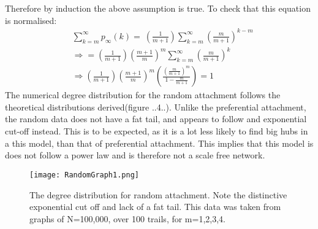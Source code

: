 \documentclass[]{article}
\begin{document}
Therefore by induction the above assumption is true. To check that this equation is normalised:
\begin{equation}
\begin{align}
	&\sum_{k=m}^{\infty}p_{\infty}(k)= \
	\left(\frac{1}{m+1}\right)\sum_{k=m}^{\infty}\left(\frac{m}{m+1}\right)^{k-m}\\
	&\Rightarrow = \left(\frac{1}{m+1}\right)\left(\frac{m+1}{m}\right)^{m}\sum_{k=m}^{\infty}\left(\frac{m}{m+1}\right)^{k}\\
&\Rightarrow \left(\frac{1}{m+1}\right)\left(\frac{m+1}{m}\right)^{m}\left( \frac{\left(\frac{m}{m+1}\right)^m}{1-\frac{m}{m+1}}\right) =1
\end{align}
\end{equation}
The numerical degree distribution for the random attachment follows the theoretical distributions derived(figure ..4..). Unlike the preferential attachment, the random data does not have a fat tail, and appears to follow and exponential cut-off instead. This is to be expected, as it is a lot less likely to find big hubs in a this model, than that of preferential attachment. This implies that this model is does not follow a power law and is therefore not a scale free network. 
\begin{figure}[htbp]
	\centering
	
	\texttt{[image: RandomGraph1.png]}
	\caption{The degree distribution for random attachment. Note the distinctive exponential cut off and lack of a fat tail. This data was taken from graphs of N=100,000, over 100 trails, for m=1,2,3,4.}
\end{figure}
\end{document}
